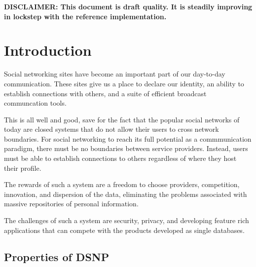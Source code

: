 \documentclass[letterpaper,11pt,oneside]{article}
\begin{document}
{\noindent\bf\large DISCLAIMER: This document is draft quality. It is steadily
improving in lockstep with the reference implementation.}

\newpage

\tableofcontents


\newpage

\section{Introduction}

Social networking sites have become an important part of our day-to-day
communication. These sites give us a place to declare our identity, an ability
to establish connections with others, and a suite of efficient broadcast communcation
tools.

This is all well and good, save for the fact that the popular social networks
of today are closed systems that do not allow their users to cross network
boundaries. For social networking to reach its full potential as a
commmunication paradigm, there must be no boundaries between service providers.
Instead, users must be able to establish connections to others regardless of
where they host their profile. 

The rewards of such a system are a freedom to choose providers, competition,
innovation, and dispersion of the data, eliminating the problems associated
with massive repositories of personal information.

The challenges of such a system are security, privacy, and developing feature
rich applications that can compete with the products developed as single
databases.

\subsection{Properties of DSNP}
\end{document}
